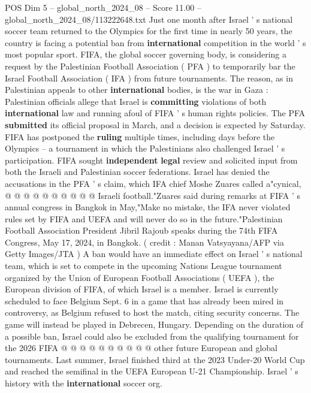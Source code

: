 \begin{textsample}{POS Dim 5 – global\_north\_2024\_08 – Score 11.00 – global\_north\_2024\_08/113222648.txt}  \label{ex:f5_pos_376}
Just one month after Israel ' s national soccer team returned to the Olympics for the first time in nearly 50 years, the country is facing a potential ban from \textbf{international} competition in the world ' s most popular sport.
FIFA, the global soccer governing body, is considering a request by the Palestinian Football Association ( PFA ) to temporarily bar the Israel Football Association ( IFA ) from future tournaments.
The reason, as in Palestinian appeals to other \textbf{international} bodies, is the war in Gaza : Palestinian officials allege that Israel is \textbf{committing} violations of both \textbf{international} law and running afoul of FIFA ' s human rights policies.
The PFA \textbf{submitted} its official proposal in March, and a decision is expected by Saturday.
FIFA has postponed the \textbf{ruling} multiple times, including days before the Olympics -- a tournament in which the Palestinians also challenged Israel ' s participation.
FIFA sought \textbf{independent} \textbf{legal} review and solicited input from both the Israeli and Palestinian soccer federations.
Israel has denied the accusations in the PFA ' s claim, which IFA chief Moshe Zuares called a"cynical, @ @ @ @ @ @ @ @ @ @ Israeli football."Zuares said during remarks at FIFA ' s annual congress in Bangkok in May,"Make no mistake, the IFA never violated rules set by FIFA and UEFA and will never do so in the future."Palestinian Football Association President Jibril Rajoub speaks during the 74th FIFA Congress, May 17, 2024, in Bangkok. ( credit : Manan Vatsyayana/AFP via Getty Images/JTA ) A ban would have an immediate effect on Israel ' s national team, which is set to compete in the upcoming Nations League tournament organized by the Union of European Football Associations ( UEFA ), the European division of FIFA, of which Israel is a member.
Israel is currently scheduled to face Belgium Sept. 6 in a game that has already been mired in controversy, as Belgium refused to host the match, citing security concerns.
The game will instead be played in Debrecen, Hungary.
Depending on the duration of a possible ban, Israel could also be excluded from the qualifying tournament for the 2026 FIFA @ @ @ @ @ @ @ @ @ @ other future European and global tournaments.
Last summer, Israel finished third at the 2023 Under-20 World Cup and reached the semifinal in the UEFA European U-21 Championship.
Israel ' s history with the \textbf{international} soccer org.

\end{textsample}
